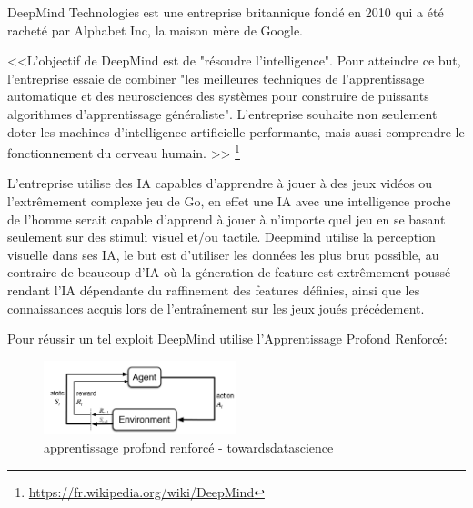 DeepMind Technologies est une entreprise britannique fondé en 2010 qui a été 
racheté par Alphabet Inc, la maison mère de Google. \newline

<<L’objectif de DeepMind est de "résoudre l'intelligence". Pour atteindre ce but, 
l'entreprise essaie de combiner "les meilleures techniques de l'apprentissage automatique et
des neurosciences des systèmes pour construire de puissants algorithmes d'apprentissage généraliste". 
L'entreprise souhaite non seulement doter les machines d'intelligence artificielle performante, 
mais aussi comprendre le fonctionnement du cerveau humain. >>
\footnote{\url{https://fr.wikipedia.org/wiki/DeepMind}} \newline

L'entreprise utilise des IA capables d'apprendre à jouer à des jeux vidéos ou l'extrêmement complexe 
jeu de Go, en effet une IA avec une intelligence proche de l'homme serait capable d'apprend à jouer 
à n'importe quel jeu en se basant seulement sur des stimuli visuel et/ou tactile. Deepmind utilise 
la perception visuelle dans ses IA, le but est d'utiliser les données les plus brut possible,
au contraire de beaucoup d'IA où la géneration de feature est extrêmement poussé rendant l'IA 
dépendante du raffinement des features définies, ainsi que les connaissances acquis lors de l'entraînement
sur les jeux joués précédement. \newline

Pour réussir un tel exploit DeepMind utilise l'Apprentissage Profond Renforcé:

\begin{figure}[H]
    \centering
    \includegraphics[width=0.5\textwidth]{Images/reinforceddeeplearning}
    \caption{apprentissage profond renforcé - towardsdatascience}
    \label{fig:reinforceddeeplearning}
\end{figure}

